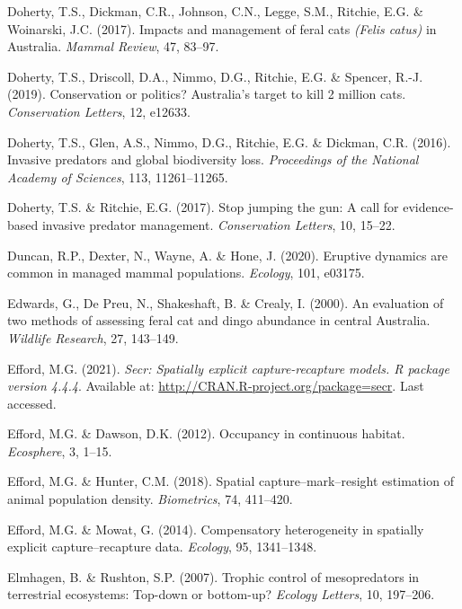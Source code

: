 \documentclass[11pt,a4paper,titlepage,twoside,openright]{style/unimelbthesis}
\begin{document}
\begin{mainmatter}
\leavevmode\hypertarget{ref-doherty2017impacts}{}%
Doherty, T.S., Dickman, C.R., Johnson, C.N., Legge, S.M., Ritchie, E.G. \& Woinarski, J.C. (2017). Impacts and management of feral cats \emph{(Felis catus)} in Australia. \emph{Mammal Review}, 47, 83--97.

\leavevmode\hypertarget{ref-doherty2019conservation}{}%
Doherty, T.S., Driscoll, D.A., Nimmo, D.G., Ritchie, E.G. \& Spencer, R.-J. (2019). Conservation or politics? Australia's target to kill 2 million cats. \emph{Conservation Letters}, 12, e12633.

\leavevmode\hypertarget{ref-doherty2016invasive}{}%
Doherty, T.S., Glen, A.S., Nimmo, D.G., Ritchie, E.G. \& Dickman, C.R. (2016). Invasive predators and global biodiversity loss. \emph{Proceedings of the National Academy of Sciences}, 113, 11261--11265.

\leavevmode\hypertarget{ref-doherty2017stop}{}%
Doherty, T.S. \& Ritchie, E.G. (2017). Stop jumping the gun: A call for evidence-based invasive predator management. \emph{Conservation Letters}, 10, 15--22.

\leavevmode\hypertarget{ref-duncan2020eruptive}{}%
Duncan, R.P., Dexter, N., Wayne, A. \& Hone, J. (2020). Eruptive dynamics are common in managed mammal populations. \emph{Ecology}, 101, e03175.

\leavevmode\hypertarget{ref-edwards2000evaluation}{}%
Edwards, G., De Preu, N., Shakeshaft, B. \& Crealy, I. (2000). An evaluation of two methods of assessing feral cat and dingo abundance in central Australia. \emph{Wildlife Research}, 27, 143--149.

\leavevmode\hypertarget{ref-efford2021secr}{}%
Efford, M.G. (2021). \emph{Secr: Spatially explicit capture-recapture models. R package version 4.4.4}. Available at: \url{http://CRAN.R-project.org/package=secr}. Last accessed.

\leavevmode\hypertarget{ref-efford2012occupancy}{}%
Efford, M.G. \& Dawson, D.K. (2012). Occupancy in continuous habitat. \emph{Ecosphere}, 3, 1--15.

\leavevmode\hypertarget{ref-efford2018spatial}{}%
Efford, M.G. \& Hunter, C.M. (2018). Spatial capture--mark--resight estimation of animal population density. \emph{Biometrics}, 74, 411--420.

\leavevmode\hypertarget{ref-efford2014compensatory}{}%
Efford, M.G. \& Mowat, G. (2014). Compensatory heterogeneity in spatially explicit capture--recapture data. \emph{Ecology}, 95, 1341--1348.

\leavevmode\hypertarget{ref-elmhagen2007trophic}{}%
Elmhagen, B. \& Rushton, S.P. (2007). Trophic control of mesopredators in terrestrial ecosystems: Top-down or bottom-up? \emph{Ecology Letters}, 10, 197--206.


\end{mainmatter}
\end{document}

